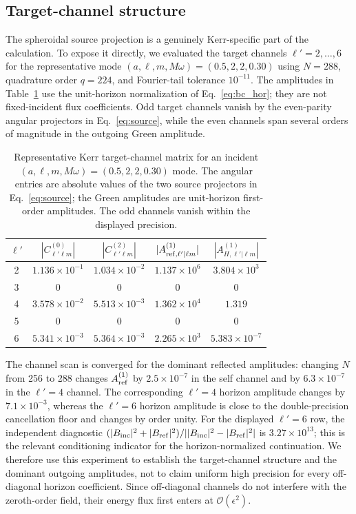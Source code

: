 \documentclass[aps,prd,twocolumn,10pt,nofootinbib,superscriptaddress,floatfix]{revtex4-2}
\begin{document}
\subsection{Target-channel structure}

The spheroidal source projection is a genuinely Kerr-specific part of the
calculation.  To expose it directly, we evaluated the target channels
$\ell'=2,\ldots,6$ for the representative mode
$(a,\ell,m,M\omega)=(0.5,2,2,0.30)$ using $N=288$, quadrature order
$q=224$, and Fourier-tail tolerance $10^{-11}$.  The amplitudes in
Table~\ref{tab:channels} use the unit-horizon normalization of
Eq.~\eqref{eq:bc_hor}; they are not fixed-incident flux coefficients.
Odd target channels vanish by the even-parity angular projectors in
Eq.~\eqref{eq:source}, while the even channels span several orders of
magnitude in the outgoing Green amplitude.

\begin{table}[t]
\caption{Representative Kerr target-channel matrix for an incident
$(a,\ell,m,M\omega)=(0.5,2,2,0.30)$ mode.  The angular entries are absolute
values of the two source projectors in Eq.~\eqref{eq:source}; the Green
amplitudes are unit-horizon first-order amplitudes.  The odd channels vanish
within the displayed precision.}
\label{tab:channels}
\begin{ruledtabular}
\begin{tabular}{c c c c c}
$\ell'$ & $|C^{(0)}_{\ell'\ell m}|$ & $|C^{(2)}_{\ell'\ell m}|$
& $|A_{{\rm ref},\ell'|\ell m}^{(1)}|$
& $|A_{H,\ell'|\ell m}^{(1)}|$\\
\hline
2 & $1.136\times10^{-1}$ & $1.034\times10^{-2}$ & $1.137\times10^{6}$ & $3.804\times10^{3}$\\
3 & $0$ & $0$ & $0$ & $0$\\
4 & $3.578\times10^{-2}$ & $5.513\times10^{-3}$ & $1.362\times10^{4}$ & $1.319$\\
5 & $0$ & $0$ & $0$ & $0$\\
6 & $5.341\times10^{-3}$ & $5.364\times10^{-3}$ & $2.265\times10^{3}$ & $5.383\times10^{-7}$\\
\end{tabular}
\end{ruledtabular}
\end{table}

The channel scan is converged for the dominant reflected amplitudes: changing
$N$ from 256 to 288 changes $A_{\rm ref}^{(1)}$ by
$2.5\times10^{-7}$ in the self channel and by $6.3\times10^{-7}$ in the
$\ell'=4$ channel.  The corresponding $\ell'=4$ horizon amplitude changes by
$7.1\times10^{-3}$, whereas the $\ell'=6$ horizon amplitude is close to the
double-precision cancellation floor and changes by order unity.  For the
displayed $\ell'=6$ row, the independent diagnostic
$(|B_{\rm inc}|^2+|B_{\rm ref}|^2)/||B_{\rm inc}|^2-|B_{\rm ref}|^2|$
is $3.27\times10^{13}$; this is the relevant conditioning indicator for the
horizon-normalized continuation.  We therefore use this experiment to
establish the target-channel structure and the dominant outgoing amplitudes,
not to claim uniform high precision for every off-diagonal horizon coefficient.
Since off-diagonal channels do not
interfere with the zeroth-order field, their energy flux first enters at
$\mathcal O(\epsilon^2)$.
\end{document}
